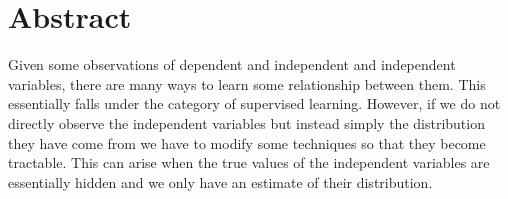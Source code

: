 \documentclass[
10pt, %
a4paper, %
oneside, %
headinclude,footinclude, %
BCOR5mm, %
]{scrartcl}
\title{\normalfont\spacedallcaps{Learning with Random Inputs}} %
\author{\spacedlowsmallcaps{Robert Wolstenholme}} %
\date{} %
\begin{document}

\renewcommand{\sectionmark}[1]{\markright{\spacedlowsmallcaps{#1}}} %
\lehead{\mbox{\llap{\small\thepage\kern1em\color{halfgray} \vline}\color{halfgray}\hspace{0.5em}\rightmark\hfil}} %

\pagestyle{scrheadings} %


\maketitle %

\setcounter{tocdepth}{2} %

\tableofcontents %

\listoffigures %

\listoftables %


\section*{Abstract} %

Given some observations of dependent and independent and independent variables, there are many ways to learn some relationship between them. This essentially falls under the category of supervised learning. However, if we do not directly observe the independent variables but instead simply the distribution they have come from we have to modify some techniques so that they become tractable. This can arise when the true values of the independent variables are essentially hidden and we only have an estimate of their distribution.
\end{document}
